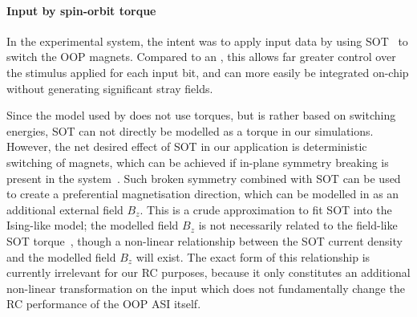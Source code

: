 \paragraph{Input by spin-orbit torque}
In the experimental system, the intent was to apply input data by using SOT~\cite{SOTswitchingCoPt} to switch the OOP magnets.
Compared to an , this allows far greater control over the stimulus applied for each input bit, and can more easily be integrated on-chip without generating significant stray fields. \par
Since the model used by \hotspice does not use torques, but is rather based on switching energies, SOT can not directly be modelled as a torque in our simulations.
However, the net desired effect of SOT in our application is deterministic switching of magnets, which can be achieved if in-plane symmetry breaking is present in the system~\cite{SOT_Roadmap}. %
Such broken symmetry combined with SOT can be used to create a preferential magnetisation direction, which can be modelled in \hotspice as an additional external field $B_z$.
This is a crude approximation to fit SOT into the Ising-like model; the modelled field $B_z$ is not necessarily related to the field-like SOT torque~\cite{SOT_firstprinciplesCoPt}, though a non-linear relationship between the SOT current density and the modelled field $B_z$ will exist.
The exact form of this relationship is currently irrelevant for our RC purposes, because it only constitutes an additional non-linear transformation on the input which does not fundamentally change the RC performance of the OOP ASI itself.


